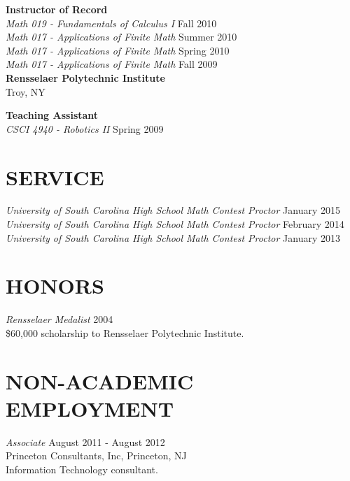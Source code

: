 \documentclass[line,overlapped]{res}
\begin{document}
\begin{resume}
         {\bf Instructor of Record}\\
         {\sl Math 019 - Fundamentals of Calculus I} \hfill Fall 2010\\
         {\sl Math 017 - Applications of Finite Math} \hfill Summer 2010\\
         {\sl Math 017 - Applications of Finite Math} \hfill Spring 2010\\
         {\sl Math 017 - Applications of Finite Math} \hfill Fall 2009\\
         
         {\bf Rensselaer Polytechnic Institute}\\Troy, NY

         {\bf Teaching Assistant}\\
         {\sl CSCI 4940 - Robotics II} \hfill Spring 2009\\

 \section{SERVICE}
         {\sl University of South Carolina High School Math Contest Proctor} \hfill January 2015\\
         {\sl University of South Carolina High School Math Contest Proctor} \hfill February 2014\\
         {\sl University of South Carolina High School Math Contest Proctor} \hfill January 2013

 \section{HONORS}
         {\sl Rensselaer Medalist} \hfill 2004\\
         \$60,000 scholarship to Rensselaer Polytechnic Institute.

 \section{NON-ACADEMIC\\EMPLOYMENT}             
         {\sl Associate} \hfill August 2011 - August 2012\\
         Princeton Consultants, Inc, Princeton, NJ\\
         Information Technology consultant.


\end{resume}
\end{document}
